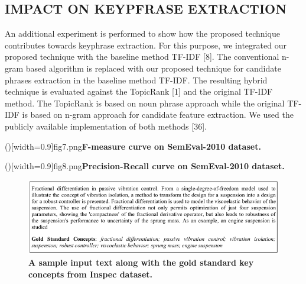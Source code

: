 \documentclass{ieeeaccess}
\begin{document}
\subsection{IMPACT ON KEYPFRASE EXTRACTION}
An additional experiment is performed to show how the proposed technique contributes towards keyphrase extraction. For this purpose, we integrated our proposed technique with the baseline method TF-IDF [8]. The conventional n-gram based algorithm is replaced with our proposed technique for candidate phrases extraction in the baseline method TF-IDF. The resulting hybrid technique is evaluated against the TopicRank [1] and the original TF-IDF method. The TopicRank is based on noun phrase approach while the original TF-IDF is based on n-gram approach for candidate feature extraction. We used the publicly available implementation of both methods [36].

\Figure[!h] ()[width=0.9\linewidth]{fig7.png}{\textbf{F-measure curve on SemEval-2010 dataset.\label{fig:f7}}}

\Figure[!h] ()[width=0.9\linewidth  ]{fig8.png}{\textbf{Precision-Recall curve on SemEval-2010 dataset.\label{fig:f8}}}

\begin{figure}[h!]
    \centering
    \includegraphics[width = 0.8\linewidth]{fig9.png}
    \caption{\textbf{A sample input text along with the gold standard key concepts from Inspec dataset.}
		\label{fig:f9}}
\end{figure}
\end{document}
